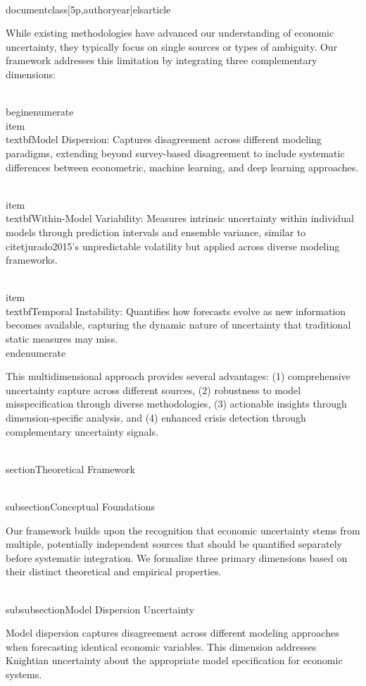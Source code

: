 \\documentclass[5p,authoryear]{elsarticle}
\begin{document}
{While existing methodologies have advanced our understanding of economic uncertainty, they typically focus on single sources or types of ambiguity. Our framework addresses this limitation by integrating three complementary dimensions:

\\begin{enumerate}
    \\item \\textbf{Model Dispersion:} Captures disagreement across different modeling paradigms, extending beyond survey-based disagreement to include systematic differences between econometric, machine learning, and deep learning approaches.
    
    \\item \\textbf{Within-Model Variability:} Measures intrinsic uncertainty within individual models through prediction intervals and ensemble variance, similar to \\citet{jurado2015}'s unpredictable volatility but applied across diverse modeling frameworks.
    
    \\item \\textbf{Temporal Instability:} Quantifies how forecasts evolve as new information becomes available, capturing the dynamic nature of uncertainty that traditional static measures may miss.
\\end{enumerate}

This multidimensional approach provides several advantages: (1) comprehensive uncertainty capture across different sources, (2) robustness to model misspecification through diverse methodologies, (3) actionable insights through dimension-specific analysis, and (4) enhanced crisis detection through complementary uncertainty signals.

\\section{Theoretical Framework}

\\subsection{Conceptual Foundations}

Our framework builds upon the recognition that economic uncertainty stems from multiple, potentially independent sources that should be quantified separately before systematic integration. We formalize three primary dimensions based on their distinct theoretical and empirical properties.

\\subsubsection{Model Dispersion Uncertainty}

Model dispersion captures disagreement across different modeling approaches when forecasting identical economic variables. This dimension addresses Knightian uncertainty about the appropriate model specification for economic systems.

}
\end{document}
